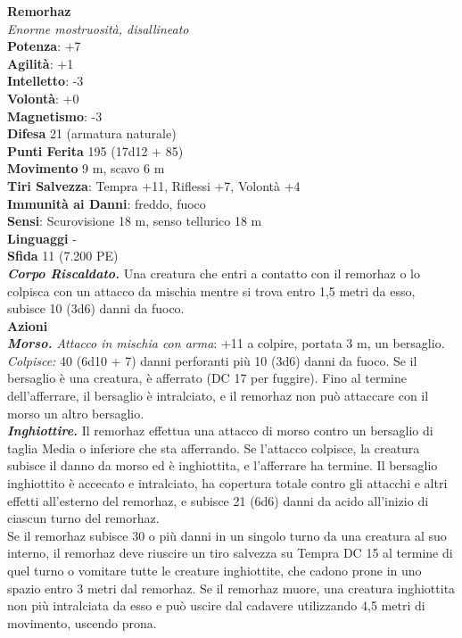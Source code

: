 \begin{multicols}{2}
\medskip\textbf{Remorhaz}\\
\emph{Enorme mostruosità, disallineato}\\
\textbf{Potenza}: +7\\
\textbf{Agilità}: +1\\
\textbf{Intelletto}: -3\\
\textbf{Volontà}: +0\\
\textbf{Magnetismo}: -3\\
\textbf{Difesa} 21 (armatura naturale)\\
\textbf{Punti Ferita} 195 (17d12 + 85)\\
\textbf{Movimento} 9 m, scavo 6 m\\
\textbf{Tiri Salvezza}: Tempra +11, Riflessi +7, Volontà +4\\
\textbf{Immunità ai Danni}: freddo, fuoco\\
\textbf{Sensi}: Scurovisione 18 m, senso tellurico 18 m\\
\textbf{Linguaggi} -\\
\textbf{Sfida} 11 (7.200 PE)\smallskip\\
\emph{\textbf{Corpo Riscaldato.}} Una creatura che entri a contatto con il remorhaz o lo colpisca con un attacco da mischia mentre si trova entro 1,5 metri da esso, subisce 10 (3d6) danni da fuoco.\\
\smallskip\textbf{Azioni}\\
\emph{\textbf{Morso.} Attacco in mischia con arma}: +11 a colpire, portata 3 m, un bersaglio.\\
\emph{Colpisce:} 40 (6d10 + 7) danni perforanti più 10 (3d6) danni da fuoco. Se il bersaglio è una creatura, è afferrato (DC 17 per fuggire). Fino al termine dell'afferrare, il bersaglio è intralciato, e il remorhaz non può attaccare con il morso un altro bersaglio.\\
\emph{\textbf{Inghiottire.}} Il remorhaz effettua una attacco di morso contro un bersaglio di taglia Media o inferiore che sta afferrando. Se l'attacco colpisce, la creatura subisce il danno da morso ed è inghiottita, e l'afferrare ha termine. Il bersaglio inghiottito è accecato e intralciato, ha copertura totale contro gli attacchi e altri effetti all'esterno del remorhaz, e subisce 21 (6d6) danni da acido all'inizio di ciascun turno del remorhaz.\\
Se il remorhaz subisce 30 o più danni in un singolo turno da una creatura al suo interno, il remorhaz deve riuscire un tiro salvezza su Tempra DC 15 al termine di quel turno o vomitare tutte le creature inghiottite, che cadono prone in uno spazio entro 3 metri dal remorhaz. Se il remorhaz muore, una creatura inghiottita non più intralciata da esso e può uscire dal cadavere utilizzando 4,5 metri di movimento, uscendo prona.\\

\end{multicols}
